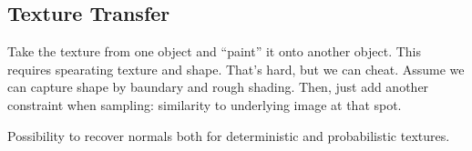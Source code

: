 \begin{compactdesc}
		\section{Texture Transfer} Take the texture from one object and ``paint'' it onto another object. This requires spearating texture and shape. That's hard, but we can cheat. Assume we can capture shape by baundary and rough shading. Then, just add another constraint when sampling: similarity to underlying image at that spot.
	\item[\lp{Shape from textures}] Possibility to recover normals both for deterministic and probabilistic textures.
\end{compactdesc}

